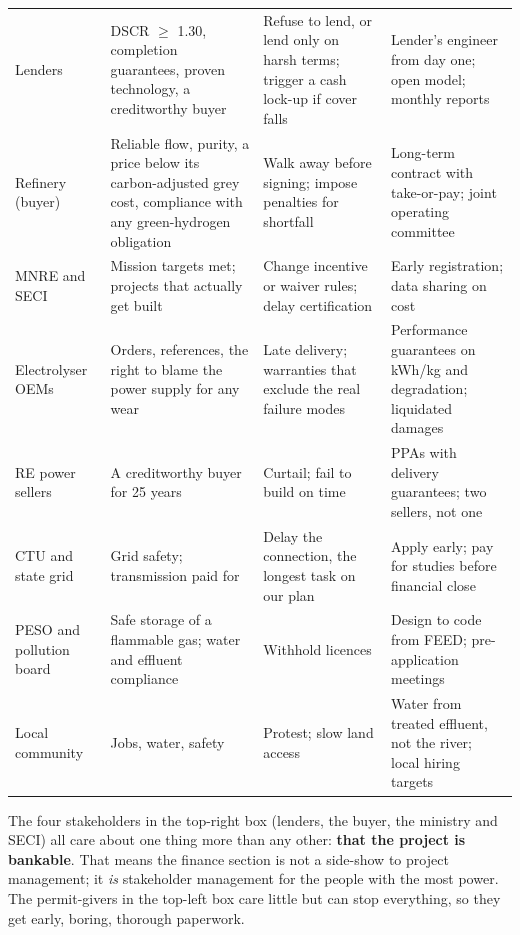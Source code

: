 \begin{center}\tablefont
\begin{xltabular}{\textwidth}{@{}P{24mm} L L P{20mm}@{}}
\toprule
{} &  &  & \\ \midrule
\endhead
Lenders & DSCR $\geq$ 1.30, completion guarantees, proven technology, a creditworthy buyer & Refuse to lend, or lend only on harsh terms; trigger a cash lock-up if cover falls & Lender's engineer from day one; open model; monthly reports\\
Refinery (buyer) & Reliable flow, purity, a price below its carbon-adjusted grey cost, compliance with any green-hydrogen obligation & Walk away before signing; impose penalties for shortfall & Long-term contract with take-or-pay; joint operating committee\\
MNRE and SECI & Mission targets met; projects that actually get built & Change incentive or waiver rules; delay certification & Early registration; data sharing on cost\\
Electrolyser OEMs & Orders, references, the right to blame the power supply for any wear & Late delivery; warranties that exclude the real failure modes & Performance guarantees on kWh/kg and degradation; liquidated damages\\
RE power sellers & A creditworthy buyer for 25 years & Curtail; fail to build on time & PPAs with delivery guarantees; two sellers, not one\\
CTU and state grid & Grid safety; transmission paid for & Delay the connection, the longest task on our plan & Apply early; pay for studies before financial close\\
PESO and pollution board & Safe storage of a flammable gas; water and effluent compliance & Withhold licences & Design to code from FEED; pre-application meetings\\
Local community & Jobs, water, safety & Protest; slow land access & Water from treated effluent, not the river; local hiring targets\\
\bottomrule
\end{xltabular}
\end{center}

\begin{finding}
The four stakeholders in the top-right box (lenders, the buyer, the ministry and SECI) all care about one thing more than any other: \textbf{that the project is bankable}. That means the finance section is not a side-show to project management; it \emph{is} stakeholder management for the people with the most power. The permit-givers in the top-left box care little but can stop everything, so they get early, boring, thorough paperwork. \confM
\end{finding}
\newpage
